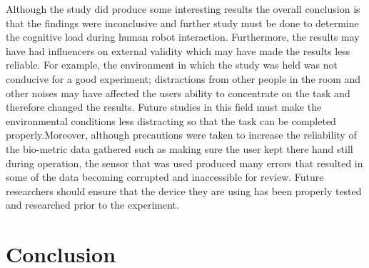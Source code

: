 \documentclass[conference]{IEEEtran}
\begin{document}

Although the study did produce some interesting results the overall conclusion is that the findings were inconclusive and further study must be done to determine the cognitive load during human robot interaction. Furthermore, the results may have had influencers on external validity which may have made the results less reliable. For example, the environment in which the study was held was not conducive for a good experiment; distractions from other people in the room and other noises may have affected the users ability to concentrate on the task and therefore changed the results. Future studies in this field must make the environmental conditions less distracting so that the task can be completed properly.\newline Moreover, although precautions were taken to increase the reliability of the bio-metric data gathered such as making sure the user kept there hand still during operation, the sensor that was used produced many errors that resulted in some of the data becoming corrupted and inaccessible for review. Future researchers should ensure that the device they are using has been properly tested and researched prior to the experiment. 
\section{Conclusion}

\end{document}
